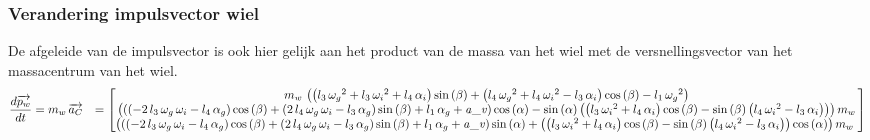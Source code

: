 \subsubsection{Verandering impulsvector wiel}
De afgeleide van de impulsvector is ook hier gelijk aan het product van de massa van het wiel met de versnellingsvector van het massacentrum van het wiel.
\begin{equation*}
\begin{split}
\frac{d\overrightarrow{{p}_{w}}}{dt}
&=m_{w}\,\overrightarrow{{a}_{C}}
&=	  \begin{bmatrix}
      m_{w}\, \left(  \left( l_{3}\,{\omega_{g}}^{
2}+l_{3}\,{\omega_{i}}^{2}+l_{4}\,\alpha_{i} \right) \sin \left( \beta
 \right) + \left( l_{4}\,{\omega_{g}}^{2}+l_{4}\,{\omega_{i}}^{2}-l_{3
}\,\alpha_{i} \right) \cos \left( \beta \right) -l_{1}\,{\omega_{g}}^{
2} \right) \\ 
%
 \left(  \left(  \left( -2\,l_{3}\,
\omega_{g}\,\omega_{i}-l_{4}\,\alpha_{g} \right) \cos \left( \beta
 \right) + \left( 2\,l_{4}\,\omega_{g}\,\omega_{i}-l_{3}\,\alpha_{g}
 \right) \sin \left( \beta \right) +l_{1}\,\alpha_{g}+{\it a\_v}
 \right) \cos \left( \alpha \right) -\sin \left( \alpha \right) 
 \left(  \left( l_{3}\,{\omega_{i}}^{2}+l_{4}\,\alpha_{i} \right) \cos
 \left( \beta \right) -\sin \left( \beta \right)  \left( l_{4}\,{
\omega_{i}}^{2}-l_{3}\,\alpha_{i} \right)  \right)  \right) m_{w}
\\ 
%
 \left(  \left(  \left( -2\,l_{3}\,\omega_{g}\,
\omega_{i}-l_{4}\,\alpha_{g} \right) \cos \left( \beta \right) +
 \left( 2\,l_{4}\,\omega_{g}\,\omega_{i}-l_{3}\,\alpha_{g} \right) 
\sin \left( \beta \right) +l_{1}\,\alpha_{g}+{\it a\_v} \right) \sin
 \left( \alpha \right) + \left(  \left( l_{3}\,{\omega_{i}}^{2}+l_{4}
\,\alpha_{i} \right) \cos \left( \beta \right) -\sin \left( \beta
 \right)  \left( l_{4}\,{\omega_{i}}^{2}-l_{3}\,\alpha_{i} \right) 
 \right) \cos \left( \alpha \right)  \right) m_{w}\
      \end{bmatrix}
\end{split}
\end{equation*}